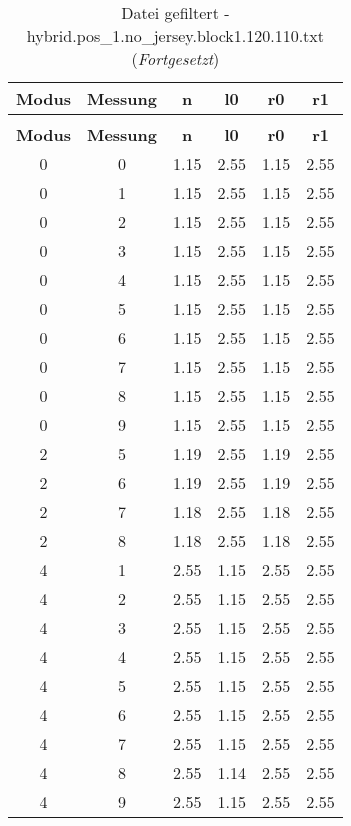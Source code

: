 \begin{longtable}{|c|c||c||c||c|c|}
	\caption{Datei gefiltert - hybrid.pos\_1.no\_jersey.block1.120.110.txt} \label{tab:hybrid.pos-1.no-jersey.block1.120.110.txt} \\ \hline
	\textbf{Modus} & \textbf{Messung} & \textbf{n} & \textbf{l0} & \textbf{r0} & \textbf{r1}\\ \hline
	\endfirsthead
	\caption[]{Datei gefiltert - hybrid.pos\_1.no\_jersey.block1.120.110.txt (\emph{Fortgesetzt})} \\ \hline
	\textbf{Modus} & \textbf{Messung} & \textbf{n} & \textbf{l0} & \textbf{r0} & \textbf{r1}\\ \hline
	\endhead
	0 & 0 & 1.15 & 2.55 & 1.15 & 2.55 \\ \hline
	0 & 1 & 1.15 & 2.55 & 1.15 & 2.55 \\ \hline
	0 & 2 & 1.15 & 2.55 & 1.15 & 2.55 \\ \hline
	0 & 3 & 1.15 & 2.55 & 1.15 & 2.55 \\ \hline
	0 & 4 & 1.15 & 2.55 & 1.15 & 2.55 \\ \hline
	0 & 5 & 1.15 & 2.55 & 1.15 & 2.55 \\ \hline
	0 & 6 & 1.15 & 2.55 & 1.15 & 2.55 \\ \hline
	0 & 7 & 1.15 & 2.55 & 1.15 & 2.55 \\ \hline
	0 & 8 & 1.15 & 2.55 & 1.15 & 2.55 \\ \hline
	0 & 9 & 1.15 & 2.55 & 1.15 & 2.55 \\ \hline
	2 & 5 & 1.19 & 2.55 & 1.19 & 2.55 \\ \hline
	2 & 6 & 1.19 & 2.55 & 1.19 & 2.55 \\ \hline
	2 & 7 & 1.18 & 2.55 & 1.18 & 2.55 \\ \hline
	2 & 8 & 1.18 & 2.55 & 1.18 & 2.55 \\ \hline
	4 & 1 & 2.55 & 1.15 & 2.55 & 2.55 \\ \hline
	4 & 2 & 2.55 & 1.15 & 2.55 & 2.55 \\ \hline
	4 & 3 & 2.55 & 1.15 & 2.55 & 2.55 \\ \hline
	4 & 4 & 2.55 & 1.15 & 2.55 & 2.55 \\ \hline
	4 & 5 & 2.55 & 1.15 & 2.55 & 2.55 \\ \hline
	4 & 6 & 2.55 & 1.15 & 2.55 & 2.55 \\ \hline
	4 & 7 & 2.55 & 1.15 & 2.55 & 2.55 \\ \hline
	4 & 8 & 2.55 & 1.14 & 2.55 & 2.55 \\ \hline
	4 & 9 & 2.55 & 1.15 & 2.55 & 2.55 \\ \hline

\end{longtable}
